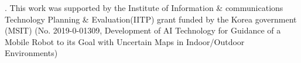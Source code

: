 \documentclass{bmvc2k}
\begin{document}
\medskip
{}. 
This  work  was supported by the Institute of Information \&  communications  Technology  Planning \&  Evaluation(IITP) grant  funded by the  Korea government (MSIT) (No.  2019-0-01309,  Development of AI  Technology for  Guidance of  a Mobile Robot to its  Goal  with  Uncertain Maps in Indoor/Outdoor Environments)


\end{document}
